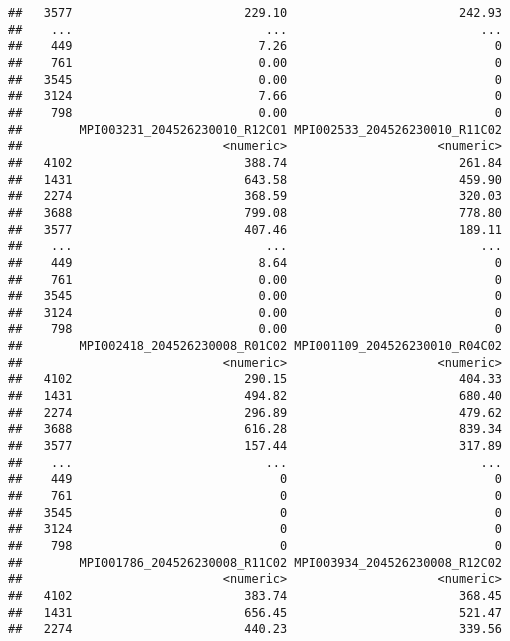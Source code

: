 \documentclass[
]{article}
\begin{document}
\begin{verbatim}
##   3577                        229.10                        242.93
##    ...                           ...                           ...
##    449                          7.26                             0
##    761                          0.00                             0
##   3545                          0.00                             0
##   3124                          7.66                             0
##    798                          0.00                             0
##        MPI003231_204526230010_R12C01 MPI002533_204526230010_R11C02
##                            <numeric>                     <numeric>
##   4102                        388.74                        261.84
##   1431                        643.58                        459.90
##   2274                        368.59                        320.03
##   3688                        799.08                        778.80
##   3577                        407.46                        189.11
##    ...                           ...                           ...
##    449                          8.64                             0
##    761                          0.00                             0
##   3545                          0.00                             0
##   3124                          0.00                             0
##    798                          0.00                             0
##        MPI002418_204526230008_R01C02 MPI001109_204526230010_R04C02
##                            <numeric>                     <numeric>
##   4102                        290.15                        404.33
##   1431                        494.82                        680.40
##   2274                        296.89                        479.62
##   3688                        616.28                        839.34
##   3577                        157.44                        317.89
##    ...                           ...                           ...
##    449                             0                             0
##    761                             0                             0
##   3545                             0                             0
##   3124                             0                             0
##    798                             0                             0
##        MPI001786_204526230008_R11C02 MPI003934_204526230008_R12C02
##                            <numeric>                     <numeric>
##   4102                        383.74                        368.45
##   1431                        656.45                        521.47
##   2274                        440.23                        339.56

\end{verbatim}
\end{document}
